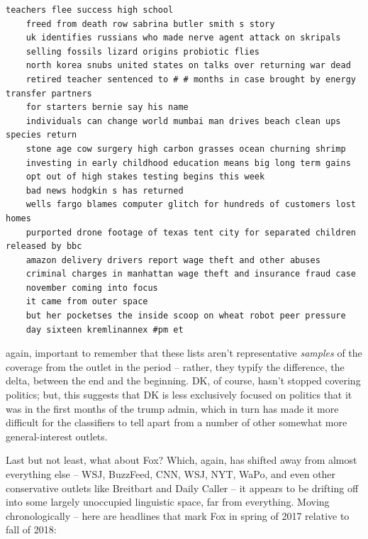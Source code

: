 \documentclass{scrartcl}
\begin{document}
\begin{lstlisting}[basicstyle=\tiny\hlfont]
    teachers flee success high school
    freed from death row sabrina butler smith s story
    uk identifies russians who made nerve agent attack on skripals
    selling fossils lizard origins probiotic flies
    north korea snubs united states on talks over returning war dead
    retired teacher sentenced to # # months in case brought by energy transfer partners
    for starters bernie say his name
    individuals can change world mumbai man drives beach clean ups species return
    stone age cow surgery high carbon grasses ocean churning shrimp
    investing in early childhood education means big long term gains
    opt out of high stakes testing begins this week
    bad news hodgkin s has returned
    wells fargo blames computer glitch for hundreds of customers lost homes
    purported drone footage of texas tent city for separated children released by bbc
    amazon delivery drivers report wage theft and other abuses
    criminal charges in manhattan wage theft and insurance fraud case
    november coming into focus
    it came from outer space
    but her pocketses the inside scoop on wheat robot peer pressure
    day sixteen kremlinannex #pm et
\end{lstlisting}

again, important to remember that these lists aren't representative \textit{samples} of the coverage from the outlet in the period -- rather, they typify the difference, the delta, between the end and the beginning. DK, of course, hasn't stopped covering politics; but, this suggests that DK is less exclusively focused on politics that it was in the first months of the trump admin, which in turn has made it more difficult for the classifiers to tell apart from a number of other somewhat more general-interest outlets.

Last but not least, what about Fox? Which, again, has shifted away from almost everything else -- WSJ, BuzzFeed, CNN, WSJ, NYT, WaPo, and even other conservative outlets like Breitbart and Daily Caller -- it appears to be drifting off into some largely unoccupied linguistic space, far from everything. Moving chronologically -- here are headlines that mark Fox in spring of 2017 relative to fall of 2018:
\end{document}

